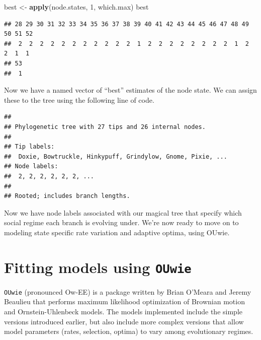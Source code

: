 \documentclass[]{book}
\newenvironment{Shaded}{\begin{snugshade}}{\end{snugshade}}
\newcommand{\KeywordTok}[1]{\textcolor[rgb]{0.13,0.29,0.53}{\textbf{{#1}}}}
\newcommand{\DecValTok}[1]{\textcolor[rgb]{0.00,0.00,0.81}{{#1}}}
\newcommand{\StringTok}[1]{\textcolor[rgb]{0.31,0.60,0.02}{{#1}}}
\newcommand{\NormalTok}[1]{{#1}}
\begin{document}
\begin{Shaded}
\begin{Highlighting}[]
\NormalTok{best <-}\StringTok{ }\KeywordTok{apply}\NormalTok{(node.states, }\DecValTok{1}\NormalTok{, which.max)}
\NormalTok{best}
\end{Highlighting}
\end{Shaded}

\begin{verbatim}
## 28 29 30 31 32 33 34 35 36 37 38 39 40 41 42 43 44 45 46 47 48 49 50 51 52 
##  2  2  2  2  2  2  2  2  2  2  2  1  2  2  2  2  2  2  2  2  1  2  2  1  1 
## 53 
##  1
\end{verbatim}

Now we have a named vector of ``best'' estimates of the node state. We
can assign these to the tree using the following line of code.

\begin{Shaded}
\end{Shaded}

\begin{verbatim}
## 
## Phylogenetic tree with 27 tips and 26 internal nodes.
## 
## Tip labels:
##  Doxie, Bowtruckle, Hinkypuff, Grindylow, Gnome, Pixie, ...
## Node labels:
##  2, 2, 2, 2, 2, 2, ...
## 
## Rooted; includes branch lengths.
\end{verbatim}

Now we have node labels associated with our magical tree that specify
which social regime each branch is evolving under. We're now ready to
move on to modeling state specific rate variation and adaptive optima,
using OUwie.

\section{\texorpdfstring{Fitting models using
\texttt{OUwie}}{Fitting models using OUwie}}\label{fitting-models-using-ouwie}

\texttt{OUwie} (pronounced Ow-EE) is a package written by Brian O'Meara
and Jeremy Beaulieu that performs maximum likelihood optimization of
Brownian motion and Ornstein-Uhlenbeck models. The models implemented
include the simple versions introduced earlier, but also include more
complex versions that allow model parameters (rates, selection, optima)
to vary among evolutionary regimes.
\end{document}
